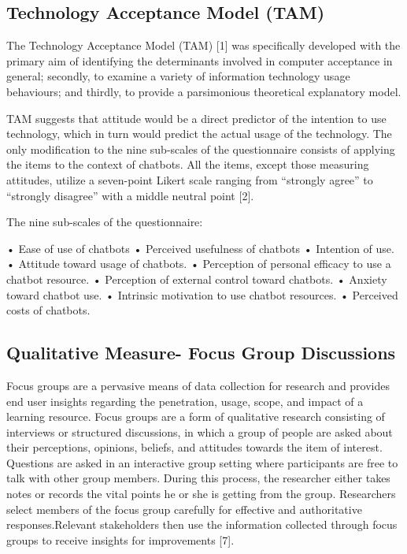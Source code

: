 \documentclass[a4paper, nobind]{templates/ociamthesis}
\begin{document}
\hypertarget{technology-acceptance-model-tam}{%
\subsection{Technology Acceptance Model (TAM)}\label{technology-acceptance-model-tam}}

The Technology Acceptance Model (TAM) {[}1{]} was specifically developed with the primary aim of identifying the determinants involved in computer acceptance in general; secondly, to examine a variety of information technology usage behaviours; and thirdly, to provide a parsimonious theoretical explanatory model.

TAM suggests that attitude would be a direct predictor of the intention to use technology, which in turn would predict the actual usage of the technology.
The only modification to the nine sub-scales of the questionnaire consists of applying the items to the context of chatbots.
All the items, except those measuring attitudes, utilize a seven-point Likert scale ranging from ``strongly agree'' to ``strongly disagree'' with a middle neutral point {[}2{]}.

The nine sub-scales of the questionnaire:

• Ease of use of chatbots
• Perceived usefulness of chatbots
• Intention of use.
• Attitude toward usage of chatbots.
• Perception of personal efficacy to use a chatbot resource.
• Perception of external control toward chatbots.
• Anxiety toward chatbot use.
• Intrinsic motivation to use chatbot resources.
• Perceived costs of chatbots.

\hypertarget{qualitative-measure--focus-group-discussions}{%
\subsection{Qualitative Measure- Focus Group Discussions}\label{qualitative-measure--focus-group-discussions}}

Focus groups are a pervasive means of data collection for research and provides end user insights regarding the penetration, usage, scope, and impact of a learning resource. Focus groups are a form of qualitative research consisting of interviews or structured discussions, in which a group of people are asked about their perceptions, opinions, beliefs, and attitudes towards the item of interest. Questions are asked in an interactive group setting where participants are free to talk with other group members. During this process, the researcher either takes notes or records the vital points he or she is getting from the group. Researchers select members of the focus group carefully for effective and authoritative responses.Relevant stakeholders then use the information collected through focus groups to receive insights for improvements {[}7{]}.
\end{document}
